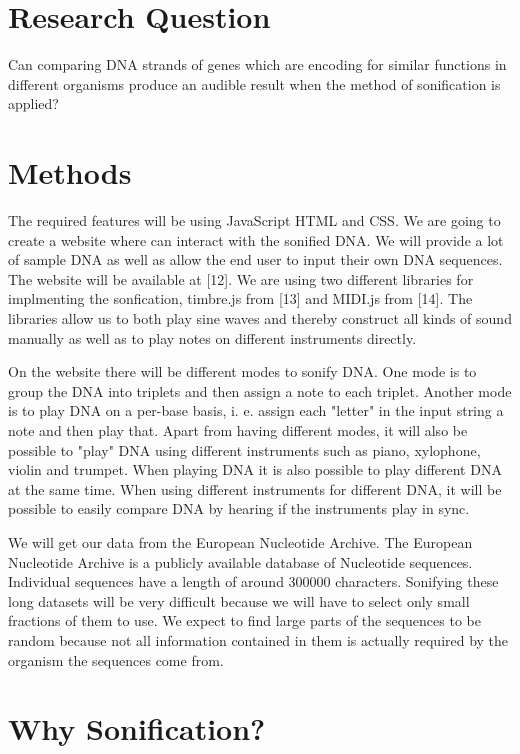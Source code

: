 \documentclass[12pt]{article}
\begin{document}
\section{Research Question}
Can comparing DNA strands of genes which are encoding for similar functions in different organisms produce an audible result when the method of sonification is applied?

\section{Methods}
The required features will be using JavaScript HTML and CSS. We are going to create a website where can interact with the sonified DNA. We will provide a lot of sample DNA as well as allow the end user to input their own DNA sequences. The website will be available at [12]. We are using two different libraries for implmenting the sonfication, timbre.js from [13] and MIDI.js from [14]. The libraries allow us to both play sine waves and thereby construct all kinds of sound manually as well as to play notes on different instruments directly. 

On the website there will be different modes to sonify DNA. One mode is to group the DNA into triplets and then assign a note to each triplet. Another mode is to play DNA on a per-base basis, i. e. assign each "letter" in the input string a note and then play that. Apart from having different modes, it will also be possible to "play" DNA using different instruments such as piano, xylophone, violin and trumpet. When playing DNA it is also possible to play different DNA at the same time. When using different instruments for different DNA, it will be possible to easily compare DNA by hearing if the instruments play in sync. 

We will get our data from the European Nucleotide Archive. The European Nucleotide Archive is a publicly available database of Nucleotide sequences. Individual sequences have a length of around 300000 characters. Sonifying these long datasets will be very difficult because we will have to select only small fractions of them to use. We expect to find large parts of the sequences to be random because not all information contained in them is actually required by the organism the sequences come from.

\section{Why Sonification?}
\end{document}
